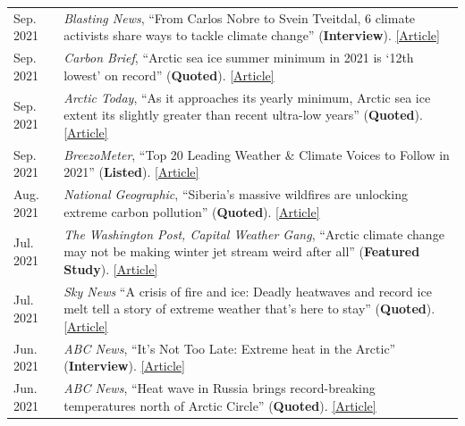 \documentclass[margin,line,palatino,courier,10pt]{res}
\begin{document}
\begin{resume}
\begin{tabular}{@{}p{0.9in}p{4in}}
Sep. 2021 & \textit{Blasting News}, ``From Carlos Nobre to Svein Tveitdal, 6 climate activists share ways to tackle climate change'' (\textbf{Interview}). \href{https://us.blastingnews.com/world/2021/01/from-carlos-nobre-to-svein-tveitdal-4-climate-activists-share-ways-to-tackle-climate-change-003258138.html}{[Article]}\\
Sep. 2021 & \textit{Carbon Brief}, ``Arctic sea ice summer minimum in 2021 is `12th lowest' on record'' (\textbf{Quoted}). \href{https://www.carbonbrief.org/arctic-sea-ice-summer-minimum-in-2021-is-12th-lowest-on-record}{[Article]}\\
Sep. 2021 & \textit{Arctic Today}, ``As it approaches its yearly minimum, Arctic sea ice extent its slightly greater than recent ultra-low years'' (\textbf{Quoted}). \href{https://www.arctictoday.com/as-it-approaches-its-yearly-minimum-arctic-sea-ice-extent-its-slightly-greater-than-recent-ultra-low-years/}{[Article]}\\
Sep. 2021 & \textit{BreezoMeter}, ``Top 20 Leading Weather \& Climate Voices to Follow in 2021'' (\textbf{Listed}). \href{https://blog.breezometer.com/leading-weather-climate-voices-to-follow}{[Article]}\\
Aug. 2021 & \textit{National Geographic}, ``Siberia’s massive wildfires are unlocking extreme carbon pollution'' (\textbf{Quoted}). \href{https://www.nationalgeographic.com/environment/article/siberias-massive-wildfires-are-unlocking-extreme-carbon-pollution}{[Article]}\\
Jul. 2021 & \textit{The Washington Post, Capital Weather Gang}, ``Arctic climate change may not be making winter jet stream weird after all'' (\textbf{Featured Study}). \href{https://www.washingtonpost.com/weather/2021/07/31/arctic-climate-change-jetstream-winter/}{[Article]}\\
Jul. 2021 & \textit{Sky News} ``A crisis of fire and ice: Deadly heatwaves and record ice melt tell a story of extreme weather that’s here to stay'' (\textbf{Quoted}). \href{https://news.sky.com/story/climate-change-as-fire-rages-across-the-us-and-canada-ice-retreats-off-the-coast-of-siberia-12359277}{[Article]}\\
Jun. 2021 & \textit{ABC News}, ``It’s Not Too Late: Extreme heat in the Arctic'' (\textbf{Interview}). \href{https://abcnews.go.com/International/video/late-extreme-heat-arctic-78501037}{[Article]}\\
Jun. 2021 & \textit{ABC News}, ``Heat wave in Russia brings record-breaking temperatures north of Arctic Circle'' (\textbf{Quoted}). \href{https://abcnews.go.com/International/heat-wave-russia-brings-record-breaking-temperatures-north/story?id=78446355}{[Article]}\\

\end{tabular}
\end{resume}
\end{document}
